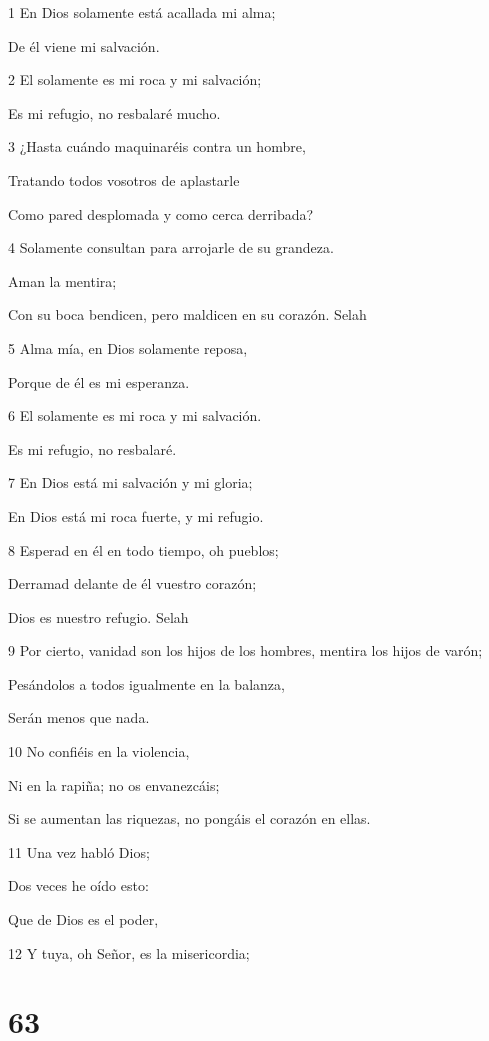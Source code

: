 \par 1 En Dios solamente está acallada mi alma;
\par De él viene mi salvación.
\par 2 El solamente es mi roca y mi salvación;
\par Es mi refugio, no resbalaré mucho.
\par 3 ¿Hasta cuándo maquinaréis contra un hombre,
\par Tratando todos vosotros de aplastarle
\par Como pared desplomada y como cerca derribada?
\par 4 Solamente consultan para arrojarle de su grandeza.
\par Aman la mentira;
\par Con su boca bendicen, pero maldicen en su corazón. Selah
\par 5 Alma mía, en Dios solamente reposa,
\par Porque de él es mi esperanza.
\par 6 El solamente es mi roca y mi salvación.
\par Es mi refugio, no resbalaré.
\par 7 En Dios está mi salvación y mi gloria;
\par En Dios está mi roca fuerte, y mi refugio.
\par 8 Esperad en él en todo tiempo, oh pueblos;
\par Derramad delante de él vuestro corazón;
\par Dios es nuestro refugio. Selah
\par 9 Por cierto, vanidad son los hijos de los hombres, mentira los hijos de varón;
\par Pesándolos a todos igualmente en la balanza,
\par Serán menos que nada.
\par 10 No confiéis en la violencia,
\par Ni en la rapiña; no os envanezcáis;
\par Si se aumentan las riquezas, no pongáis el corazón en ellas.
\par 11 Una vez habló Dios;
\par Dos veces he oído esto:
\par Que de Dios es el poder,
\par 12 Y tuya, oh Señor, es la misericordia; 
\par  

\chapter{63}


